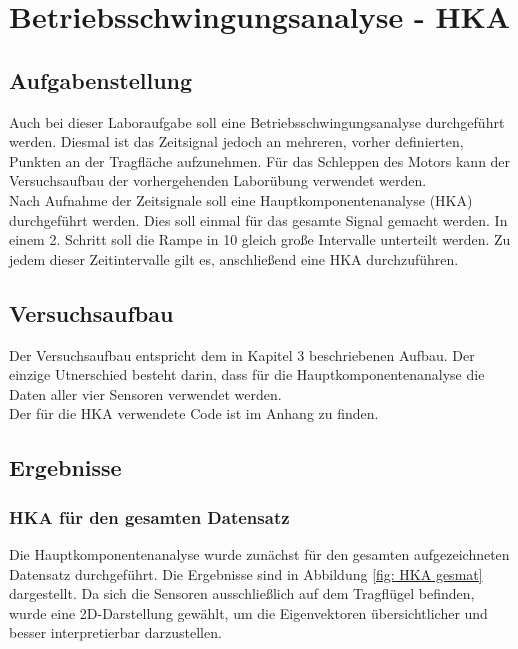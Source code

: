 \chapter{Betriebsschwingungsanalyse - HKA}
\label{sec: Hauptkapitel 3}

\section{Aufgabenstellung}
    Auch bei dieser Laboraufgabe soll eine Betriebsschwingungsanalyse
    durchgeführt werden. Diesmal ist das Zeitsignal jedoch an mehreren, vorher
    definierten, Punkten an der Tragfläche aufzunehmen. Für das Schleppen des
    Motors kann der Versuchsaufbau der vorhergehenden Laborübung verwendet
    werden.
    \\

    \noindent
    Nach Aufnahme der Zeitsignale soll eine Hauptkomponentenanalyse (HKA)
    durchgeführt werden. Dies soll einmal für das gesamte Signal gemacht werden.
    In einem 2. Schritt soll die Rampe in 10 gleich große Intervalle unterteilt
    werden. Zu jedem dieser Zeitintervalle gilt es, anschließend eine HKA
    durchzuführen.

\section{Versuchsaufbau}
    Der Versuchsaufbau entspricht dem in Kapitel 3 beschriebenen Aufbau. Der einzige 
    Utnerschied besteht darin, dass für die Hauptkomponentenanalyse die Daten aller 
    vier Sensoren verwendet werden. 
    \\

    \noindent
    Der für die HKA verwendete Code ist im Anhang zu finden.

\section{Ergebnisse}
    \subsection{HKA für den gesamten Datensatz}
        Die Hauptkomponentenanalyse wurde zunächst für den gesamten aufgezeichneten
        Datensatz durchgeführt. Die Ergebnisse sind in Abbildung \ref{fig: HKA gesmat} dargestellt.
        Da sich die Sensoren ausschließlich auf dem Tragflügel befinden, wurde 
        eine 2D-Darstellung gewählt, um die Eigenvektoren übersichtlicher und besser 
        interpretierbar darzustellen.


